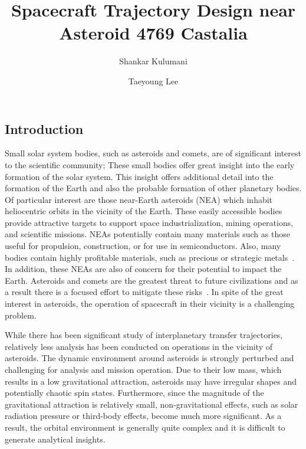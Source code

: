 \documentclass[11pt,reqno]{amsart} %
\title{\vspace{-1.0cm}Spacecraft Trajectory Design near Asteroid 4769 Castalia}
\author{Shankar Kulumani}
\author{Taeyoung Lee}
\date{} %
\begin{document}
\maketitle
\begin{multicols}{2}
\section{Introduction}
Small solar system bodies, such as asteroids and comets, are of significant interest to the scientific community; These small bodies offer great insight into the early formation of the solar system.
This insight offers additional detail into the formation of the Earth and also the probable formation of other planetary bodies.
Of particular interest are those near-Earth asteroids (NEA) which inhabit heliocentric orbits in the vicinity of the Earth.
These easily accessible bodies provide attractive targets to support space industrialization, mining operations, and scientific missions.
NEAs potentially contain many materials such as those useful for propulsion, construction, or for use in semiconductors.
Also, many bodies contain highly profitable materials, such as precious or strategic metals~\cite{ross2001}.
In addition, these NEAs are also of concern for their potential to impact the Earth.
Asteroids and comets are the greatest threat to future civilizations and as a result there is a focused effort to mitigate these risks~\cite{wie2008}.
In spite of the great interest in asteroids, the operation of spacecraft in their vicinity is a challenging problem.

While there has been significant study of interplanetary transfer trajectories, relatively less analysis has been conducted on operations in the vicinity of asteroids.
The dynamic environment around asteroids is strongly perturbed and challenging for analysis and mission operation.
Due to their low mass, which results in a low gravitational attraction, asteroids may have irregular shapes and potentially chaotic spin states.
Furthermore, since the magnitude of the gravitational attraction is relatively small, non-gravitational effects, such as solar radiation pressure or third-body effects, become much more significant.
As a result, the orbital environment is generally quite complex and it is difficult to generate analytical insights.


\end{multicols}
\end{document}
